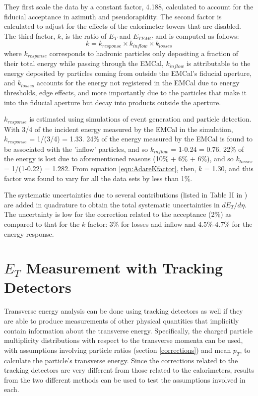 They first scale the data by a constant factor, 4.188, calculated to account for the fiducial acceptance in azimuth and pseudorapidity. The second factor is calculated to adjust for the effects of the calorimeter towers that are disabled. The third factor, $k$, is the ratio of $E_{T}$ and $E_{{T}EMC}$ and is computed as follows:
\begin{equation}\label{eqn:AdareKfactor}
k = k_{response} \times k_{inflow} \times k_{losses}
\end{equation}
where $k_{response}$ corresponds to hadronic particles only depositing a fraction of their total energy while passing through the EMCal, $k_{inflow}$ is attributable to the energy deposited by particles coming from outside the EMCal's fiducial aperture, and $k_{losses}$ accounts for the energy not registered in the EMCal due to energy thresholds, edge effects, and more importantly due to the particles that make it into the fiducial aperture but decay into products outside the aperture.

$k_{response}$ is estimated using simulations of event generation and particle detection. With 3/4 of the incident energy measured by the EMCal in the simulation, $k_{response}$ = 1/(3/4) = 1.33. 24\% of the energy measured by the EMCal is found to be associated with the 'inflow' particles, and so $k_{inflow}$ = 1-0.24 = 0.76. 22\% of the energy is lost due to aforementioned reasons (10\% + 6\% + 6\%), and so $k_{losses}$ = 1/(1-0.22) = 1.282. From equation \ref{eqn:AdareKfactor}, then, $k$ = 1.30, and this factor was found to vary for all the data sets by less than 1\%. 

The systematic uncertainties due to several contributions (listed in Table II in \cite{PhysRevC.93.024901}) are added in quadrature to obtain the total systematic uncertainties in $dE_{T}/d\eta$. The uncertainty is low for the correction related to the acceptance (2\%)
as compared to that for the $k$ factor: 3\% for losses and inflow and 4.5\%-4.7\% for the energy response.

\section{$E_{T}$ Measurement with Tracking Detectors}
Transverse energy analysis can be done using tracking detectors as well if they are able to produce measurements of other physical quantities that implicitly contain information about the transverse energy. Specifically, the charged particle multiplicity distributions with respect to the transverse momenta can be used, with assumptions involving particle ratios (section \ref{corrections}) and mean $p_{T}$, to calculate the particle's transverse energy. Since the corrections related to the tracking detectors are very different from those related to the calorimeters, results from the two different methods can be used to test the assumptions involved in each.

